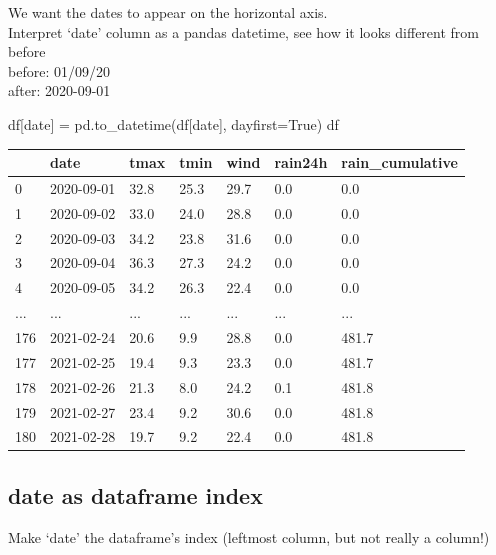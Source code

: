 \documentclass[
  letterpaper,
  DIV=11,
  numbers=noendperiod]{scrreprt}
\newenvironment{Shaded}{\begin{snugshade}}{\end{snugshade}}
\newcommand{\NormalTok}[1]{\textcolor[rgb]{0.00,0.23,0.31}{#1}}
\newcommand{\OperatorTok}[1]{\textcolor[rgb]{0.37,0.37,0.37}{#1}}
\newcommand{\StringTok}[1]{\textcolor[rgb]{0.13,0.47,0.30}{#1}}
\newcommand{\VariableTok}[1]{\textcolor[rgb]{0.07,0.07,0.07}{#1}}
\begin{document}
We want the dates to appear on the horizontal axis.\\
Interpret `date' column as a pandas datetime, see how it looks different
from before\\
before: 01/09/20\\
after: 2020-09-01

\begin{Shaded}
\begin{Highlighting}[]
\NormalTok{df[}\StringTok{\textquotesingle{}date\textquotesingle{}}\NormalTok{] }\OperatorTok{=}\NormalTok{ pd.to\_datetime(df[}\StringTok{\textquotesingle{}date\textquotesingle{}}\NormalTok{], dayfirst}\OperatorTok{=}\VariableTok{True}\NormalTok{)}
\NormalTok{df}
\end{Highlighting}
\end{Shaded}

\begin{longtable}[]{@{}lllllll@{}}
\toprule()
& date & tmax & tmin & wind & rain24h & rain\_cumulative \\
\midrule()
\endhead
0 & 2020-09-01 & 32.8 & 25.3 & 29.7 & 0.0 & 0.0 \\
1 & 2020-09-02 & 33.0 & 24.0 & 28.8 & 0.0 & 0.0 \\
2 & 2020-09-03 & 34.2 & 23.8 & 31.6 & 0.0 & 0.0 \\
3 & 2020-09-04 & 36.3 & 27.3 & 24.2 & 0.0 & 0.0 \\
4 & 2020-09-05 & 34.2 & 26.3 & 22.4 & 0.0 & 0.0 \\
... & ... & ... & ... & ... & ... & ... \\
176 & 2021-02-24 & 20.6 & 9.9 & 28.8 & 0.0 & 481.7 \\
177 & 2021-02-25 & 19.4 & 9.3 & 23.3 & 0.0 & 481.7 \\
178 & 2021-02-26 & 21.3 & 8.0 & 24.2 & 0.1 & 481.8 \\
179 & 2021-02-27 & 23.4 & 9.2 & 30.6 & 0.0 & 481.8 \\
180 & 2021-02-28 & 19.7 & 9.2 & 22.4 & 0.0 & 481.8 \\
\bottomrule()
\end{longtable}

\hypertarget{date-as-dataframe-index}{%
\subsection{date as dataframe index}\label{date-as-dataframe-index}}

Make `date' the dataframe's index (leftmost column, but not really a
column!)
\end{document}
